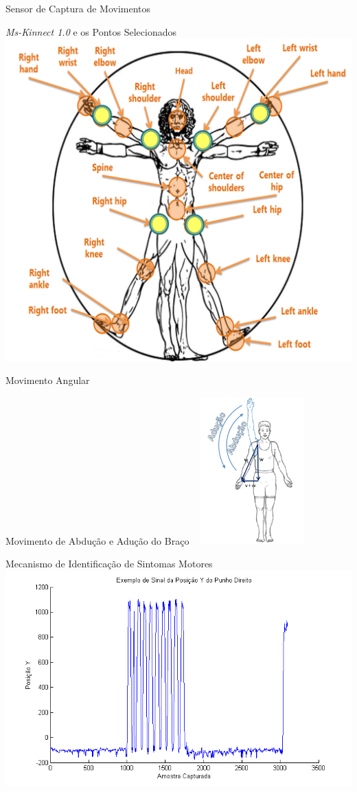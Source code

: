 \documentclass{beamer}
\begin{document}
\begin{frame}{Sensor de Captura de Movimentos}
  \begin{block}{\textit{Ms-Kinnect 1.0} e os Pontos Selecionados}
      \center \includegraphics[height=2.6 in]{img/articulacoes-sel.png}
  \end{block}
\end{frame}

\begin{frame}{Movimento Angular}
  \begin{block}{Movimento de Abdução e Adução do Braço ~\cite{mcginnis2013biomechanics}}
      \center \includegraphics[width=4cm]{img/abducao-angulo.png}
  \end{block}
\end{frame}

\begin{frame}{Mecanismo de Identificação de Sintomas Motores}
      \center \includegraphics[height=3 in]{img/exsinalposicaoypunhodireito.png}
\end{frame}
\end{document}
